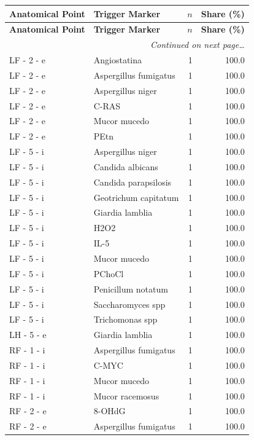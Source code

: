 \documentclass[a4paper,11pt]{article}
\begin{document}
\begin{footnotesize}
\begin{longtable}{p{3.5cm}p{7.5cm}rr}
\toprule
\textbf{Anatomical Point} &
\textbf{Trigger Marker} &
\textbf{$n$} &
\textbf{Share (\%)} \\
\midrule
\endfirsthead
\toprule
\textbf{Anatomical Point} &
\textbf{Trigger Marker} &
\textbf{$n$} &
\textbf{Share (\%)} \\
\midrule
\endhead
\midrule
\multicolumn{4}{r}{\footnotesize\emph{Continued on next page\ldots}} \\
\endfoot
\bottomrule
\endlastfoot
LF - 2 - e & Angiostatina & 1 & 100.0 \\
LF - 2 - e & Aspergillus fumigatus & 1 & 100.0 \\
LF - 2 - e & Aspergillus niger & 1 & 100.0 \\
LF - 2 - e & C-RAS & 1 & 100.0 \\
LF - 2 - e & Mucor mucedo & 1 & 100.0 \\
LF - 2 - e & PEtn & 1 & 100.0 \\
LF - 5 - i & Aspergillus niger & 1 & 100.0 \\
LF - 5 - i & Candida albicans & 1 & 100.0 \\
LF - 5 - i & Candida parapsilosis & 1 & 100.0 \\
LF - 5 - i & Geotrichum capitatum & 1 & 100.0 \\
LF - 5 - i & Giardia lamblia & 1 & 100.0 \\
LF - 5 - i & H2O2 & 1 & 100.0 \\
LF - 5 - i & IL-5 & 1 & 100.0 \\
LF - 5 - i & Mucor mucedo & 1 & 100.0 \\
LF - 5 - i & PChoCl & 1 & 100.0 \\
LF - 5 - i & Penicillum notatum & 1 & 100.0 \\
LF - 5 - i & Saccharomyces spp & 1 & 100.0 \\
LF - 5 - i & Trichomonas spp & 1 & 100.0 \\
LH - 5 - e & Giardia lamblia & 1 & 100.0 \\
RF - 1 - i & Aspergillus fumigatus & 1 & 100.0 \\
RF - 1 - i & C-MYC & 1 & 100.0 \\
RF - 1 - i & Mucor mucedo & 1 & 100.0 \\
RF - 1 - i & Mucor racemosus & 1 & 100.0 \\
RF - 2 - e & 8-OHdG & 1 & 100.0 \\
RF - 2 - e & Aspergillus fumigatus & 1 & 100.0 \\

\end{longtable}
\end{footnotesize}
\end{document}
